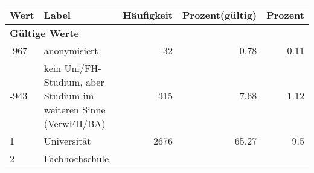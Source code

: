      \begin{longtable}{lXrrr}
     \toprule
     \textbf{Wert} & \textbf{Label} & \textbf{Häufigkeit} & \textbf{Prozent(gültig)} & \textbf{Prozent} \\
     \endhead
     \midrule
     \multicolumn{5}{l}{\textbf{Gültige Werte}}\\

     -967 &
     \multicolumn{1}{X}{ anonymisiert   } &


       \num{32} &
       \num[round-mode=places,round-precision=2]{0,78} &
         \num[round-mode=places,round-precision=2]{0,11} \\

     -943 &
     \multicolumn{1}{X}{ kein Uni/FH-Studium, aber Studium im weiteren Sinne (VerwFH/BA)   } &


       \num{315} &
       \num[round-mode=places,round-precision=2]{7,68} &
         \num[round-mode=places,round-precision=2]{1,12} \\

     1 &
     \multicolumn{1}{X}{ Universität   } &


       \num{2676} &
       \num[round-mode=places,round-precision=2]{65,27} &
         \num[round-mode=places,round-precision=2]{9,5} \\

     2 &
     \multicolumn{1}{X}{ Fachhochschule   } &



\end{longtable}
